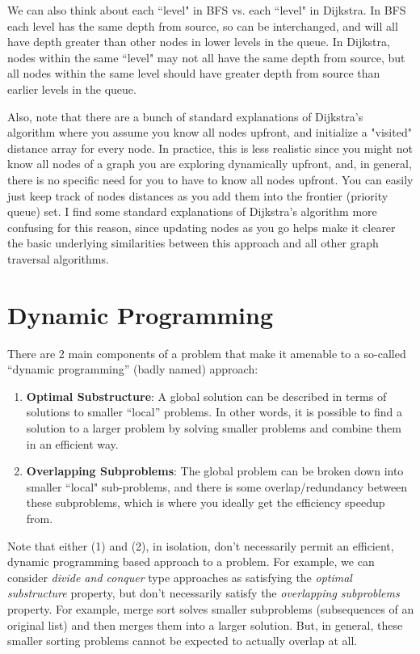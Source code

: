 \documentclass[10pt,a4paper]{article}
\begin{document}
We can also think about each ``level" in BFS vs. each ``level" in Dijkstra. In BFS each level has the same depth from source, so can be interchanged, and will all have depth greater than other nodes in lower levels in the queue. In Dijkstra, nodes within the same ``level" may not all have the same depth from source, but all nodes within the same level should have greater depth from source than earlier levels in the queue.

Also, note that there are a bunch of standard explanations of Dijkstra's algorithm where you assume you know all nodes upfront, and initialize a "visited" distance array for every node. In practice, this is less realistic since you might not know all nodes of a graph you are exploring dynamically upfront, and, in general, there is no specific need for you to have to know all nodes upfront. You can easily just keep track of nodes distances as you add them into the frontier (priority queue) set. I find some standard explanations of Dijkstra's algorithm more confusing for this reason, since updating nodes as you go helps make it clearer the basic underlying similarities between this approach and all other graph traversal algorithms.

\section{Dynamic Programming}

There are 2 main components of a problem that make it amenable to a so-called ``dynamic programming'' (badly named) approach:
\begin{enumerate}
    \item \textbf{Optimal Substructure}: A global solution can be described in terms of solutions to smaller ``local'' problems. In other words, it is possible to find a solution to a larger problem by solving smaller problems and combine them in an efficient way. 
    \item \textbf{Overlapping Subproblems}: The global problem can be broken down into smaller ``local" sub-problems, and there is some overlap/redundancy between these subproblems, which is where you ideally get the efficiency speedup from.
\end{enumerate}
Note that either (1) and (2), in isolation, don't necessarily permit an efficient, dynamic programming based approach to a problem. For example, we can consider \textit{divide and conquer} type approaches as satisfying the \textit{optimal substructure} property, but don't necessarily satisfy the \textit{overlapping subproblems} property. For example, merge sort solves smaller subproblems (subsequences of an original list) and then merges them into a larger solution. But, in general, these smaller sorting problems cannot be expected to actually overlap at all.
\end{document}
